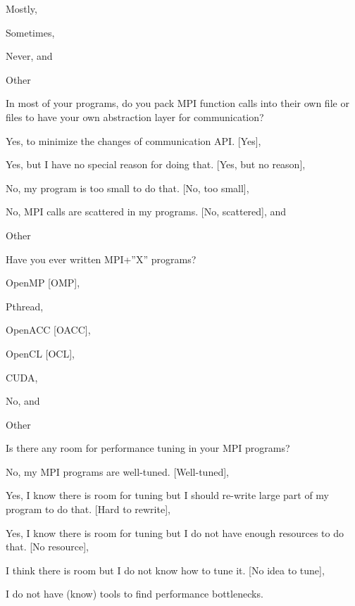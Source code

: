 \documentclass[preprint,5p,times]{elsarticle}
\begin{document}
{{\begin{description}
\begin{inparaenum}[{\bf C}1)]
    \item Mostly,
    \item Sometimes,
    \item Never, and
    \item Other
    \end{inparaenum}
  \item[Q21:] In most of your programs, do you pack MPI function calls into their own file or files to have your own abstraction layer for communication?
    \begin{inparaenum}[{\bf C}1)]
    \item Yes, to minimize the changes of communication API. [Yes],
    \item Yes, but I have no special reason for doing that. [Yes, but no reason],
    \item No, my program is too small to do that. [No, too small],
    \item No, MPI calls are scattered in my programs. [No, scattered], and
    \item Other
    \end{inparaenum}
  \item[Q22*:] Have you ever written MPI+”X” programs?
    \begin{inparaenum}[{\bf C}1)]
    \item OpenMP [OMP],
    \item Pthread,
    \item OpenACC [OACC],
    \item OpenCL [OCL],
    \item CUDA,
    \item No, and
    \item Other
    \end{inparaenum}
  \item[Q23:] Is there any room for performance tuning in your MPI programs?
    \begin{inparaenum}[{\bf C}1)]
    \item No, my MPI programs are well-tuned. [Well-tuned],
    \item Yes, I know there is room for tuning but I should re-write large
      part of my program to do that. [Hard to rewrite],
    \item Yes, I know there is room for tuning but I do not have enough resources to do that. [No resource],
    \item I think there is room but I do not know how to tune it.
      [No idea to tune],
    \item I do not have (know) tools to find performance bottlenecks.

\end{inparaenum}
\end{description}}}
\end{document}
